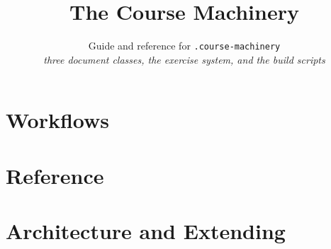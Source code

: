 \documentclass{CourseDocument}
\title{The Course Machinery}
\subtitle{Guide and reference for \texttt{.course-machinery}\\[1ex]
  \normalfont\normalsize\itshape three document classes, the exercise system,
  and the build scripts}
\begin{document}
\maketitle
\pagestyle{toc}
\tableofcontents
\newpage
\pagestyle{myfancy}



\part{Workflows}








\part{Reference}\label{part:reference}


















\part{Architecture and Extending}\label{part:architecture}

\end{document}
